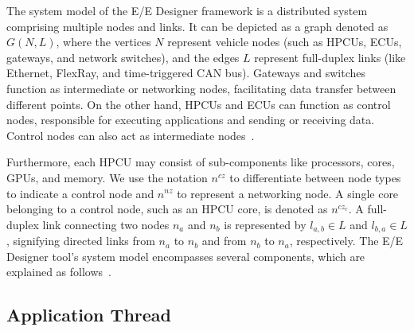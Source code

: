 The system model of the E/E Designer framework is a distributed system comprising multiple nodes and links. It can be depicted as a graph denoted as $G(N, L)$, where the vertices $N$ represent vehicle nodes (such as HPCUs, ECUs, gateways, and network switches), and the edges $L$ represent full-duplex links (like Ethernet, FlexRay, and time-triggered CAN bus). Gateways and switches function as intermediate or networking nodes, facilitating data transfer between different points. On the other hand, HPCUs and ECUs can function as control nodes, responsible for executing applications and sending or receiving data. Control nodes can also act as intermediate nodes~\cite{askaripoor2023designer}.



Furthermore, each HPCU may consist of sub-components like processors, cores, GPUs, and memory. We use the notation $n^{cz}$ to differentiate between node types to indicate a control node and $n^{nz}$ to represent a networking node. A single core belonging to a control node, such as an HPCU core, is denoted as $n^{cz_c}$.
A full-duplex link connecting two nodes $n_a$ and $n_b$ is represented by $l_{a, b} \in L$ and $l_{b, a} \in L$, signifying directed links from $n_a$ to $n_b$ and from $n_b$ to $n_a$, respectively. The E/E Designer tool's system model encompasses several components, which are explained as follows~\cite{askaripoor2023designer, 9565115}.



\subsection{Application Thread}

